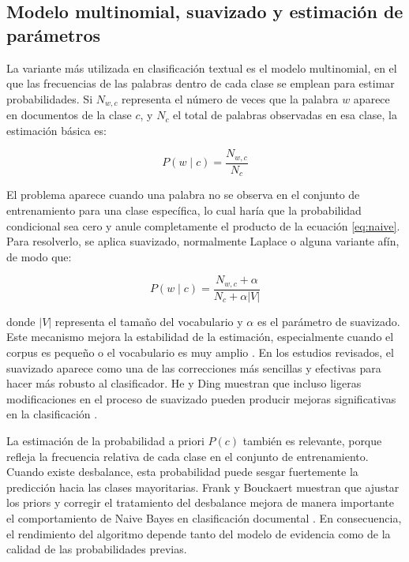 \subsection{Modelo multinomial, suavizado y estimación de parámetros}

La variante más utilizada en clasificación textual es el modelo multinomial, en el que las frecuencias de las palabras dentro de cada clase se emplean para estimar probabilidades. Si $N_{w,c}$ representa el número de veces que la palabra $w$ aparece en documentos de la clase $c$, y $N_c$ el total de palabras observadas en esa clase, la estimación básica es:

\begin{equation}
P(w \mid c) = \frac{N_{w,c}}{N_c}
\label{eq:mnb_basic}
\end{equation}

El problema aparece cuando una palabra no se observa en el conjunto de entrenamiento para una clase específica, lo cual haría que la probabilidad condicional sea cero y anule completamente el producto de la ecuación \eqref{eq:naive}. Para resolverlo, se aplica suavizado, normalmente Laplace o alguna variante afín, de modo que:

\begin{equation}
P(w \mid c) = \frac{N_{w,c} + \alpha}{N_c + \alpha |V|}
\label{eq:smoothing}
\end{equation}

donde $|V|$ representa el tamaño del vocabulario y $\alpha$ es el parámetro de suavizado. Este mecanismo mejora la estabilidad de la estimación, especialmente cuando el corpus es pequeño o el vocabulario es muy amplio \cite{10.1007/978-3-540-71496-5_73}. En los estudios revisados, el suavizado aparece como una de las correcciones más sencillas y efectivas para hacer más robusto al clasificador. He y Ding muestran que incluso ligeras modificaciones en el proceso de suavizado pueden producir mejoras significativas en la clasificación \cite{10.1007/978-3-540-71496-5_73}.

La estimación de la probabilidad a priori $P(c)$ también es relevante, porque refleja la frecuencia relativa de cada clase en el conjunto de entrenamiento. Cuando existe desbalance, esta probabilidad puede sesgar fuertemente la predicción hacia las clases mayoritarias. Frank y Bouckaert muestran que ajustar los priors y corregir el tratamiento del desbalance mejora de manera importante el comportamiento de Naive Bayes en clasificación documental \cite{Frank2006}. En consecuencia, el rendimiento del algoritmo depende tanto del modelo de evidencia como de la calidad de las probabilidades previas.

